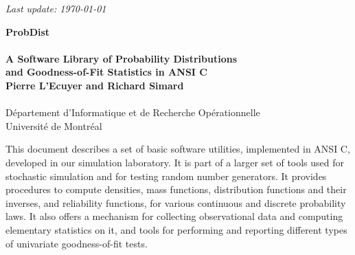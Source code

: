 \begin{titlepage}

\null 
\begin {flushright} \it Last update: \today \end {flushright}

\vfill
\begin{center}
 {\Large\bf ProbDist} \\ \ \\
 {\large\bf A Software Library of Probability Distributions\\[6pt]
    and Goodness-of-Fit Statistics in {ANSI C}}\\
\vfill
 {\bf Pierre L'Ecuyer and Richard Simard} \\ \ \\
\medskip
D\'epartement d'Informatique et de Recherche Op\'erationnelle \\
Universit\'e de Montr\'eal \\
\end{center}
\vfill

This document describes a set of basic software utilities,
implemented in ANSI C, developed in our simulation laboratory.
It is part of a larger set of tools used for stochastic simulation
and for testing random number generators.
It provides procedures to compute densities, mass functions, 
distribution functions and their inverses, and reliability functions,
for various continuous and discrete probability laws.
It also offers a mechanism for collecting observational data and
computing elementary statistics on it, and tools for performing and
reporting different types of univariate goodness-of-fit tests.

\vfill
\end{titlepage}

